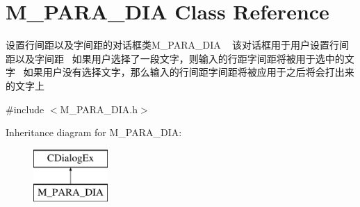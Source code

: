 \hypertarget{class_m___p_a_r_a___d_i_a}{}\section{M\+\_\+\+P\+A\+R\+A\+\_\+\+D\+IA Class Reference}
\label{class_m___p_a_r_a___d_i_a}


设置行间距以及字间距的对话框类\+M\+\_\+\+P\+A\+R\+A\+\_\+\+D\+IA ~\newline
该对话框用于用户设置行间距以及字间距~\newline
如果用户选择了一段文字，则输入的行距字间距将被用于选中的文字~\newline
如果用户没有选择文字，那么输入的行间距字间距将被应用于之后将会打出来的文字上~\newline
 




{\ttfamily \#include $<$M\+\_\+\+P\+A\+R\+A\+\_\+\+D\+I\+A.\+h$>$}

Inheritance diagram for M\+\_\+\+P\+A\+R\+A\+\_\+\+D\+IA\+:\begin{figure}[H]
\begin{center}
\leavevmode
\includegraphics[height=2.000000cm]{class_m___p_a_r_a___d_i_a}
\end{center}
\end{figure}
